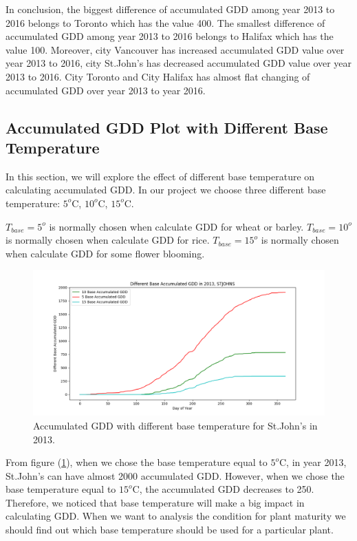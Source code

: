 \documentclass[12pt]{article}
\begin{document}
In conclusion, the biggest difference of accumulated GDD among year 2013 to 2016 belongs to Toronto which has the value 400. The smallest difference of accumulated GDD among year 2013 to 2016 belongs to Halifax which has the value 100. Moreover, city Vancouver has increased accumulated GDD value over year 2013 to 2016, city St.John's has decreased accumulated GDD value over year 2013 to 2016. City Toronto and City Halifax has almost flat changing of accumulated GDD over year 2013 to year 2016.

\subsection{Accumulated GDD Plot with Different Base Temperature}
In this section, we will explore the effect of different base temperature on calculating accumulated GDD. In our project we choose three different base temperature: $5^{o}$C, $10^{o}$C, $15^{o}$C. 

$T_{base}=5^{o}$ is normally chosen when calculate GDD for wheat or barley. $T_{base}=10^{o}$ is normally chosen when calculate GDD for rice. $T_{base}=15^{o}$ is normally chosen when calculate GDD for some flower blooming.
\begin{center}
\begin{figure}[H]
\includegraphics[width=5.25in]{../Plot/STJOHNS/accGDD_Base_2013.png}
\caption{Accumulated GDD with different base temperature for St.John's in 2013.}
\label{17}
\end{figure}
\end{center}


From figure (\ref{17}), when we chose the base temperature equal to $5^{o}$C, in year 2013, St.John's can have almost 2000 accumulated GDD. However, when we chose the base temperature equal to $15^{o}$C, the accumulated GDD  decreases to 250. Therefore, we noticed that base temperature will make a big impact in calculating GDD. When we want to analysis the condition for plant maturity we should find out which base temperature should be used for a particular plant.
\end{document}
